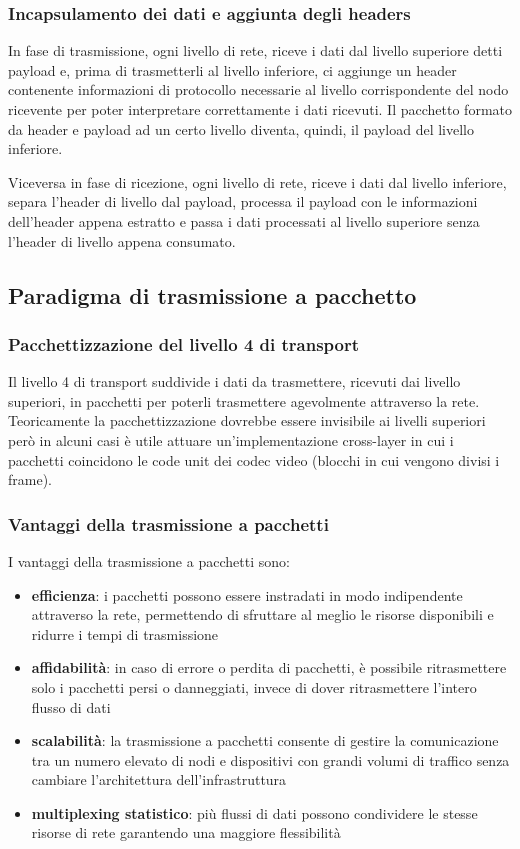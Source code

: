 \subsubsection*{Incapsulamento dei dati e aggiunta degli headers}
In fase di trasmissione, ogni livello di rete, riceve i dati dal livello superiore detti payload e, prima di trasmetterli
al livello inferiore, ci aggiunge un header contenente informazioni di protocollo necessarie al livello corrispondente del
nodo ricevente per poter interpretare correttamente i dati ricevuti. Il pacchetto formato da header e payload ad un certo
livello diventa, quindi, il payload del livello inferiore.

Viceversa in fase di ricezione, ogni livello di rete, riceve i dati dal livello inferiore, separa l'header di livello
dal payload, processa il payload con le informazioni dell'header appena estratto e passa i dati processati al livello
superiore senza l'header di livello appena consumato.

\newpage

\subsection{Paradigma di trasmissione a pacchetto}
\subsubsection*{Pacchettizzazione del livello 4 di transport}
Il livello 4 di transport suddivide i dati da trasmettere, ricevuti dai livello superiori, in pacchetti per poterli
trasmettere agevolmente attraverso la rete. Teoricamente la pacchettizzazione dovrebbe essere invisibile ai livelli
superiori però in alcuni casi è utile attuare un'implementazione cross-layer in cui i pacchetti coincidono le code
unit dei codec video (blocchi in cui vengono divisi i frame).

\subsubsection*{Vantaggi della trasmissione a pacchetti}
I vantaggi della trasmissione a pacchetti sono:
\begin{itemize}
	\item \textbf{efficienza}: i pacchetti possono essere instradati in modo indipendente attraverso la rete,
	permettendo di sfruttare al meglio le risorse disponibili e ridurre i tempi di trasmissione
	\item \textbf{affidabilità}: in caso di errore o perdita di pacchetti, è possibile ritrasmettere solo i
	pacchetti persi o danneggiati, invece di dover ritrasmettere l'intero flusso di dati
	\item \textbf{scalabilità}: la trasmissione a pacchetti consente di gestire la comunicazione tra un numero
	elevato di nodi e dispositivi con grandi volumi di traffico senza cambiare l'architettura dell'infrastruttura
	\item \textbf{multiplexing statistico}: più flussi di dati possono condividere le stesse risorse di rete
	garantendo una maggiore flessibilità
\end{itemize}

